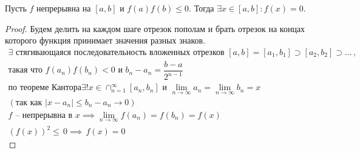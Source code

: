 \begin{theorem} \label{przn1}
	Пусть $ f $ непрерывна на $ [a, b] $ и $ f(a)f(b) \leq  0 $. Тогда $ \exists  x \in [a, b]: f(x) = 0 $.
\end{theorem} \begin{proof}
	Будем делить на каждом шаге отрезок пополам и брать отрезок на концах которого функция принимает значения разных знаков. \begin{gather}
		\exists \text{ стягивающаяся последовательность вложенных отрезков } [a, b] = [a_1, b_1] \supset [a_2, b_2] \supset \dots\,, \\
		 \text{такая что } f(a_n)f(b_n) < 0 \text{ и } b_n - a_n = \dfrac{b - a}{2^{n - 1}}\, \\
		\text{по теореме Кантора} \exists! x \in \cap_{n = 1}^\infty[a_n, b_n] \text{ и } \lim_{n \to  \infty}a_n = \lim_{n \to \infty}b_n = x \\
		(\text{так как } |x - a_n| \leq b_n - a_n \to 0) \\
		f \text{ -- непрерывна в } x \implies \lim_{n \to \infty}f( a_n) = f( b_n) = f(x) \\
		\left(f(x)\right)^2 \leq\, 0 \implies\, f(x) = 0
	\end{gather}
\end{proof}

